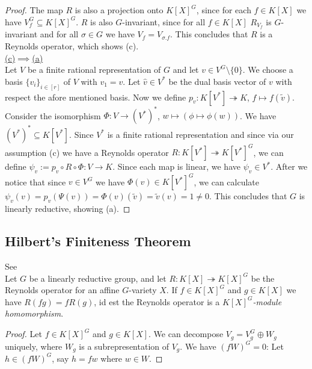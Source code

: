 \begin{proof}
  The map $R$ is also a projection onto $K[X]^G$, since for each $f \in K[X]$ we have $V_f^G \subseteq K[X]^G$.
  $R$ is also $G$-invariant, since for all $f \in K[X]$ $R_{V_f}$ is $G$-invariant and for all $\sigma \in G$ we have $V_f = V_{\sigma.f}$.
  This concludes that $R$ is a Reynolds operator, which shows (c).  \\
  \underline{(c)$\implies$(a)}  \\
  Let $V$ be a finite rational representation of $G$ and let $v \in V^G \setminus \{0\}$.
  We choose a basis $\{v_i\}_{i\in [r]}$ of $V$ with $v_1 = v$.
  Let $\hat{v} \in V^\ast$ be the dual basis vector of $v$ with respect the afore mentioned basis.
  Now we define $p_v \colon K[V^\ast] \twoheadrightarrow K$, $f \mapsto f(\tilde{v})$.
  Consider the isomorphism $\Phi \colon V \longrightarrow (V^\ast)^\ast$, $w \mapsto (\phi \mapsto \phi (w))$.
  We have $(V^\ast)^\ast \subseteq K[V^\ast]$.
  Since $V^\ast$ is a finite rational representation and since via our assumption (c) we have a Reynolds operator $R \colon K[V^\ast] \twoheadrightarrow K[V^\ast]^G$, we can define $ \psi_v := p_v \circ R \circ \Phi \colon V \longrightarrow K$.
  Since each map is linear, we have $\psi_v \in V^\ast$.
  After we notice that since $v \in V^G$ we have $\Phi (v) \in K[V^\ast]^G$, we can calculate $\psi_v (v) = p_v (\Psi(v)) = \Phi (v) (\tilde{v}) = \tilde{v} (v) = 1 \neq 0$.
  This concludes that $G$ is linearly reductive, showing (a).
\end{proof}

\subsection{Hilbert's Finiteness Theorem}

\begin{proposition}
  See \cite[p.41 Corollary 2.2.7]{DK15}\\
  Let $G$ be a linearly reductive group, and let $ R \colon K[X] \twoheadrightarrow K[X]^G $ be the Reynolds operator for an affine $G$-variety $X$.
  If $f \in K[X]^G$ and $g \in K[X]$ we have $R(fg) = fR(g)$, id est the Reynolds operator is a \textit{$K[X]^G$-module homomorphism}.
\end{proposition}

\begin{proof}
  Let $f \in K[X]^G$ and $g \in K[X]$.
  We can decompose $V_g = V_g^G \oplus W_g$ uniquely, where $W_g$ is a subrepresentation of $V_g$.
  We have $(fW)^G = {0}$:
  Let $h \in (fW)^G$, say $h = fw$ where $w \in W$.
\end{proof}

